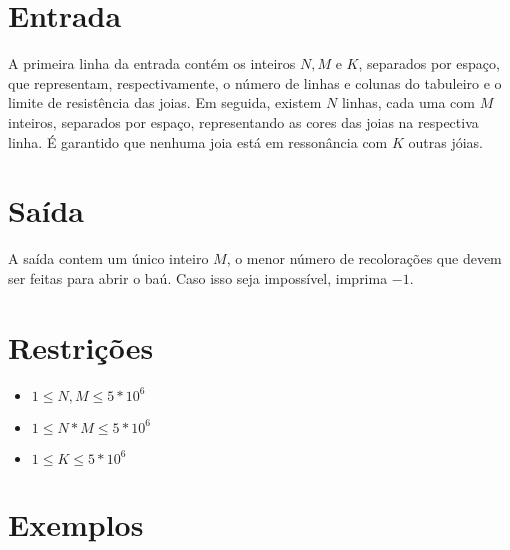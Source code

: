 \section*{Entrada}

A primeira linha da entrada contém os inteiros $N, M$ e $K$, separados por espaço, que representam, respectivamente, o número de linhas e colunas do tabuleiro e o limite de resistência das joias.
Em seguida, existem $N$ linhas, cada uma com $M$ inteiros, separados por espaço, representando as cores das joias na respectiva linha.
É garantido que nenhuma joia está em ressonância com $K$ outras jóias.

\section*{Saída}

A saída contem um único inteiro $M$, o menor número de recolorações que devem ser feitas para abrir o baú.
Caso isso seja impossível, imprima $-1$.

\section*{Restrições}

\begin{itemize}
\item $1 \leq N, M \leq 5 * 10^6$
\item $1 \leq N*M \leq 5 * 10^6$
\item $1 \leq K \leq 5 * 10^6$
\end{itemize}


\section*{Exemplos}

\exemplo
